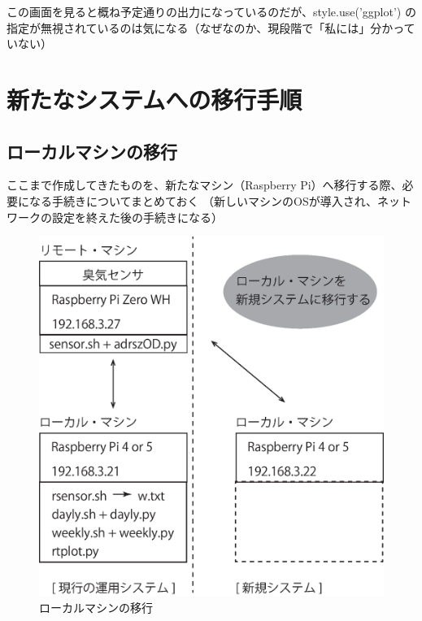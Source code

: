 \documentclass[12pt,a4paper,uplatex]{jsarticle}
\begin{document}
この画面を見ると概ね予定通りの出力になっているのだが、style.use('ggplot') の指定が無視されているのは気になる（なぜなのか、現段階で「私には」分かっていない）

\section{新たなシステムへの移行手順}

\subsection{ローカルマシンの移行}

ここまで作成してきたものを、新たなマシン（Raspberry Pi）へ移行する際、必要になる手続きについてまとめておく
（新しいマシンのOSが導入され、ネットワークの設定を終えた後の手続きになる）

\begin{figure}[htbp]
	\begin{minipage}[b]{1.0\linewidth}
		\centering
		\includegraphics[keepaspectratio, scale=0.4]{figs/eps/ikou.eps}
		\caption{ローカルマシンの移行}
	\end{minipage}
\end{figure}
\end{document}
